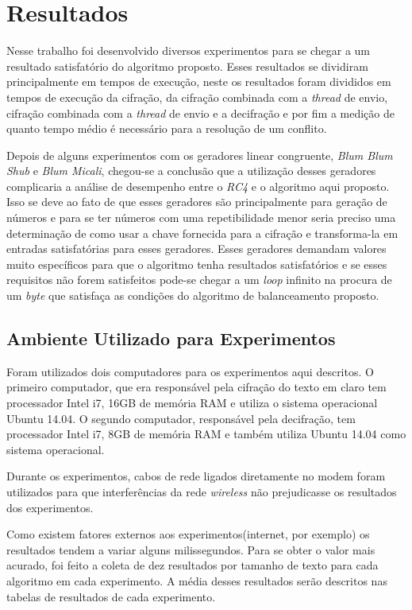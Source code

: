 \chapter{Resultados}
\label{results}

Nesse trabalho foi desenvolvido diversos experimentos para se chegar a um resultado satisfatório do algoritmo proposto. Esses resultados se dividiram principalmente em tempos de execução, neste os resultados foram divididos em tempos de execução da cifração, da cifração combinada com a \textit{thread} de envio, cifração combinada com a \textit{thread} de envio e a decifração e por fim a medição de quanto tempo médio é necessário para a resolução de um conflito.

Depois de alguns experimentos com os geradores linear congruente, \textit{Blum Blum Shub} e \textit{Blum Micali}, chegou-se a conclusão que a utilização desses geradores complicaria a análise de desempenho entre o \textit{RC4} e o algoritmo aqui proposto. Isso se deve ao fato de que esses geradores são principalmente para geração de números e para se ter números com uma repetibilidade menor seria preciso uma determinação de como usar a chave fornecida para a cifração e transforma-la em entradas satisfatórias para esses geradores. Esses geradores demandam valores muito específicos para que o algoritmo tenha resultados satisfatórios e se esses requisitos não forem satisfeitos pode-se chegar a um \textit{loop} infinito na procura de um \textit{byte} que satisfaça as condições do algoritmo de balanceamento proposto.

\section{Ambiente Utilizado para Experimentos}

Foram utilizados dois computadores para os experimentos aqui descritos. O primeiro computador, que era responsável pela cifração do texto em claro tem processador Intel i7, 16GB de memória RAM e utiliza o sistema operacional Ubuntu 14.04. O segundo computador, responsável pela decifração, tem processador Intel i7, 8GB de memória RAM e também utiliza Ubuntu 14.04 como sistema operacional.

Durante os experimentos, cabos de rede ligados diretamente no modem foram utilizados para que interferências da rede \textit{wireless} não prejudicasse os resultados dos experimentos. 

Como existem fatores externos aos experimentos(internet, por exemplo) os resultados tendem a variar alguns milissegundos. Para se obter o valor mais acurado, foi feito a coleta de dez resultados por tamanho de texto para cada algoritmo em cada experimento. A média desses resultados serão descritos nas tabelas de resultados de cada experimento.

